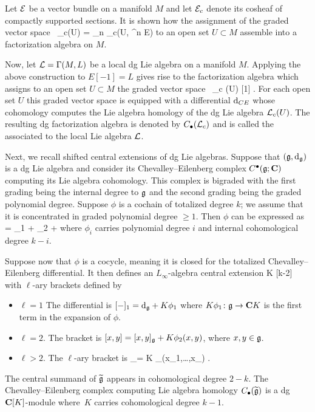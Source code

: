 \documentclass[11pt]{amsart}
\begin{document}
Let $\mathcal E$ be a vector bundle on a manifold $M$ and let $\mathcal E_c$ denote its cosheaf of compactly supported sections.
It is shown how the assignment of the graded vector space
\beqn
\Sym \, \cE_c(U) = \oplus_{n } \Gamma_c(U, \Sym^n E)
\eeqn
to an open set $U \subset M$ assemble into a factorization algebra on $M$.

Now, let $\mathcal L = \Gamma(M,L)$ be a local dg Lie algebra on a manifold $M$.
Applying the above construction to $E[-1] = L$ gives rise to the factorization algebra which assigns to an open set $U \subset M$ the graded vector space 
\beqn
\Sym \, \cL_c (U) [1] .
\eeqn
For each open set $U$ this graded vector space is equipped with a differential ${\rm d}_{CE}$ whose cohomology computes the Lie algebra homology of the dg Lie algebra $\mathcal L_c(U)$.
The resulting dg factorization algebra is denoted by $C_\bullet(\mathcal L_c)$ and is called the  associated to the local Lie algebra $\mathcal L$. 

Next, we recall shifted central extensions of dg Lie algebras.
Suppose that $(\mathfrak{g},{\rm d}_{\mathfrak{g}})$ is a dg Lie algebra and consider its Chevalley--Eilenberg complex $C^\bullet(\mathfrak{g};\mathbf{C})$ computing its Lie algebra cohomology.
This complex is bigraded with the first grading being the internal degree to $\mathfrak{g}$ and the second grading being the graded polynomial degree.
Suppose $\phi$ is a cochain of totalized degree $k$; we assume that it is concentrated in graded polynomial degree $\geq 1$.
Then $\phi$ can be expressed as
\beqn
\phi = \phi_1 + \phi_2 + \cdots 
\eeqn
where $\phi_i$ carries polynomial degree $i$ and internal cohomological degree $k-i$.

Suppose now that $\phi$ is a cocycle, meaning it is closed for the totalized Chevalley--Eilenberg differential.
It then defines an $L_\infty$-algebra central extension
 \to \C K [k-2] \to  {} \to {} 
\eeqn
with $\ell$-ary brackets defined by
\begin{itemize}
\item $\ell = 1$
The differential is $[-]_1 = {\rm d}_{\mathfrak{g}} + K \phi_1$ where $K \phi_1 \colon \mathfrak{g} \to \mathbf{C} K$ is the first term in the expansion of $\phi$.
\item $\ell=2$. 
The bracket is $[x,y] = [x,y]_{\mathfrak{g}} + K \phi_2(x,y)$, where $x,y \in \mathfrak{g}$.
\item $\ell > 2$.
The $\ell$-ary bracket is
_\ell = K \phi_\ell(x_1,\ldots,x_\ell) .
\eeqn
\end{itemize}
The central summand of $\widetilde{\mathfrak{g}}$ appears in cohomological degree $2-k$. 
The Chevalley--Eilenberg complex computing Lie algebra homology $C_\bullet(\widetilde{\mathfrak{g}})$ is a dg $\mathbf{C}[K]$-module where~$K$ carries cohomological degree $k-1$.
\end{document}
